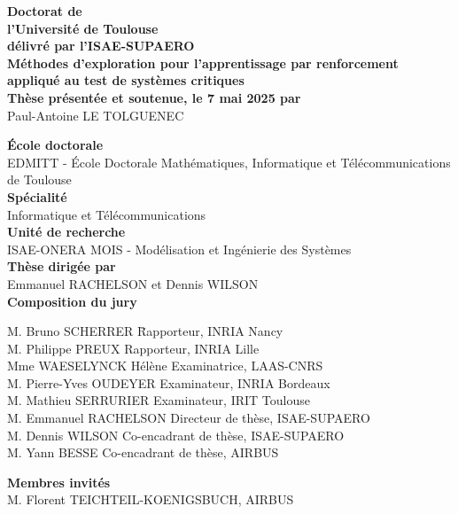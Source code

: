 \documentclass[a4paper,12pt]{article}
\begin{document}
\color{customColor}

\begin{flushright}
    \textbf{\LARGE Doctorat de\\ l'Université de Toulouse} \\[0.5cm]
    \textbf{\large délivré par l'ISAE-SUPAERO} \\[2cm]
    
    \textbf{\Huge Méthodes d'exploration pour l'apprentissage par renforcement appliqué au test de systèmes critiques} \\[1.5cm]
    
    \textbf{\Large Thèse présentée et soutenue, le 7 mai 2025 par} \\[0.5cm]
    
    {\LARGE Paul-Antoine LE TOLGUENEC} \\[2cm]
\end{flushright}

\begin{flushleft}
    \textbf{\large École doctorale} \\
    {\Large EDMITT - École Doctorale Mathématiques, Informatique et Télécommunications de Toulouse} \\[0.5cm]
    
    \textbf{\large Spécialité} \\
    {\Large Informatique et Télécommunications} \\[0.5cm]
    
    \textbf{\large Unité de recherche} \\
    {\Large ISAE-ONERA MOIS - Modélisation et Ingénierie des Systèmes} \\[2cm]
    
    \textbf{\large Thèse dirigée par} \\
    {\Large Emmanuel RACHELSON et Dennis WILSON} \\[2cm]
    
    \textbf{\large Composition du jury} \\
    {\begin{tabbing}
    M. Bruno SCHERRER \hspace{2cm} \= Rapporteur, INRIA Nancy \\
    M. Philippe PREUX \> Rapporteur, INRIA Lille \\
    Mme WAESELYNCK Hélène \> Examinatrice, LAAS-CNRS \\
    M. Pierre-Yves OUDEYER \> Examinateur, INRIA Bordeaux \\
    M. Mathieu SERRURIER \> Examinateur, IRIT Toulouse \\
    M. Emmanuel RACHELSON \> Directeur de thèse, ISAE-SUPAERO \\
    M. Dennis WILSON \> Co-encadrant de thèse, ISAE-SUPAERO \\
    M. Yann BESSE \> Co-encadrant de thèse, AIRBUS
    \end{tabbing}}
    
    \textbf{\large Membres invités} \\
    {\Large M. Florent TEICHTEIL-KOENIGSBUCH, AIRBUS} 
\end{flushleft}
\end{document}
